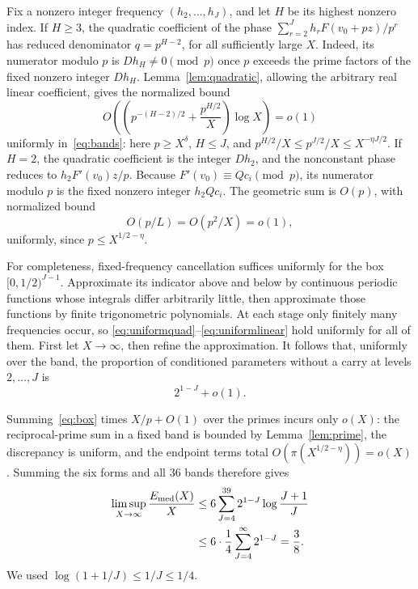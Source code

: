 \documentclass[11pt,a4paper]{article}
\newcommand{\1}{\mathbf 1}
\numberwithin{equation}{section}
\begin{document}
Fix a nonzero integer frequency \((h_2,\ldots,h_J)\), and let \(H\)
be its highest nonzero index. If \(H\geq3\), the quadratic coefficient
of the phase \(\sum_{r=2}^Jh_rF(v_0+pz)/p^r\) has reduced denominator
\(q=p^{H-2}\), for all sufficiently large \(X\). Indeed, its numerator
modulo \(p\) is \(Dh_H\neq0\pmod p\) once \(p\) exceeds the prime
factors of the fixed nonzero integer \(Dh_H\).
Lemma~\ref{lem:quadratic}, allowing the arbitrary real linear coefficient,
gives the normalized bound
\begin{equation}\label{eq:uniformquad}
 O\!\left(\left(p^{-(H-2)/2}+\frac{p^{H/2}}X\right)\log X\right)=o(1)
\end{equation}
uniformly in~\eqref{eq:bands}: here \(p\geq X^\delta\), \(H\leq J\), and
\(p^{H/2}/X\leq p^{J/2}/X\leq X^{-\eta J/2}\).
If \(H=2\), the quadratic coefficient is the integer \(Dh_2\), and the
nonconstant phase reduces to \(h_2F'(v_0)z/p\). Because
\(F'(v_0)\equiv Qc_i\pmod p\), its numerator modulo \(p\) is the fixed
nonzero integer \(h_2Qc_i\). The geometric sum is \(O(p)\), with
normalized bound
\begin{equation}\label{eq:uniformlinear}
 O(p/L)=O(p^2/X)=o(1),
\end{equation}
uniformly, since \(p\leq X^{1/2-\eta}\).

For completeness, fixed-frequency cancellation suffices uniformly for the
box \([0,1/2)^{J-1}\). Approximate its indicator above and below by
continuous periodic functions whose integrals differ arbitrarily little,
then approximate those functions by finite trigonometric polynomials.
At each stage only finitely many frequencies occur, so
\eqref{eq:uniformquad}--\eqref{eq:uniformlinear} hold uniformly for all
of them. First let \(X\to\infty\), then refine the approximation.
It follows that, uniformly over the band, the proportion of conditioned
parameters without a carry at levels \(2,\ldots,J\) is
\begin{equation}\label{eq:box}
 2^{1-J}+o(1).
\end{equation}

Summing~\eqref{eq:box} times \(X/p+O(1)\) over the primes incurs only
\(o(X)\): the reciprocal-prime sum in a fixed band is bounded by
Lemma~\ref{lem:prime}, the discrepancy is uniform, and the endpoint
terms total \(O(\pi(X^{1/2-\eta}))=o(X)\). Summing the six forms and
all 36 bands therefore gives
\begin{equation}\label{eq:medium}
\begin{aligned}
 \limsup_{X\to\infty}\frac{E_{\rm med}(X)}X
 &\leq6\sum_{J=4}^{39}2^{1-J}\log\frac{J+1}{J}\\
 &\leq6\cdot\frac14\sum_{J=4}^{\infty}2^{1-J}
 =\frac38.
\end{aligned}
\end{equation}
We used \(\log(1+1/J)\leq1/J\leq1/4\).
\end{document}
